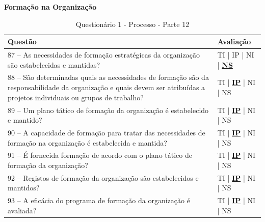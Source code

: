 \documentclass[openany,10pt,a4paper]{article}
\begin{document}
\begin{appendix}
	\begin{table}[h]
	\textbf{Formação na Organização}
		\centering
		\caption{Questionário 1 - Processo - Parte 12}
		\begin{tabular}{p{5in}p{1in}}		
			\toprule
			\textbf{Questão}  & \textbf{Avaliação}\\ 
			\midrule
			87 – As necessidades de formação estratégicas da organização são estabelecidas e mantidas?
	 & TI | IP | NI | \underline{\textbf{NS}} \\
			\midrule
			88 – São determinadas quais as necessidades de formação são da responsabilidade da 
	organização e quais devem ser atribuídas a projetos individuais ou grupos de trabalho?
	 & TI | \underline{\textbf{IP}} | NI | NS \\
			\midrule
			89 – Um plano tático de formação da organização é estabelecido e mantido?
	 & TI | \underline{\textbf{IP}} | NI | NS \\
			\midrule
			90 – A capacidade de formação para tratar das necessidades de formação na organização é 
	estabelecida e mantida?
	 & TI | \underline{\textbf{IP}} | NI | NS \\
			\midrule
			91 – É fornecida formação de acordo com o plano tático de formação da organização?
	  & TI | \underline{\textbf{IP}} | NI | NS \\
			\midrule
			92 – Registos de formação da organização são estabelecidos e mantidos?
	 & TI | \underline{\textbf{IP}} | NI | NS \\
	 \midrule
			93 – A eficácia do programa de formação da organização é avaliada?
	 & TI | \underline{\textbf{IP}} | NI | NS \\
			\bottomrule
		\end{tabular} 
	\end{table}
	

\end{appendix}
\end{document}
